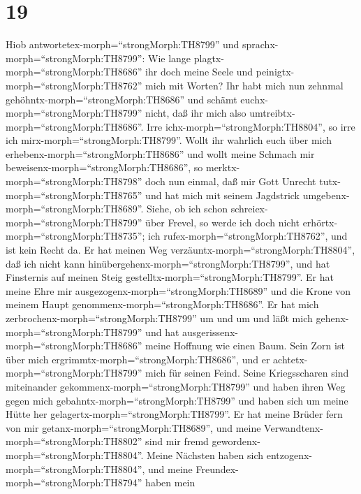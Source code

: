 \hypertarget{section-18}{%
\section{19}\label{section-18}}

 Hiob antwortetex-morph=``strongMorph:TH8799'' und
sprachx-morph=``strongMorph:TH8799'':  Wie lange
plagtx-morph=``strongMorph:TH8686'' ihr doch meine Seele und
peinigtx-morph=``strongMorph:TH8762'' mich mit Worten?  Ihr
habt mich nun zehnmal gehöhntx-morph=``strongMorph:TH8686'' und schämt
euchx-morph=``strongMorph:TH8799'' nicht, daß ihr mich also
umtreibtx-morph=``strongMorph:TH8686''.  Irre
ichx-morph=``strongMorph:TH8804'', so irre ich
mirx-morph=``strongMorph:TH8799''.  Wollt ihr wahrlich euch
über mich erhebenx-morph=``strongMorph:TH8686'' und wollt meine Schmach
mir beweisenx-morph=``strongMorph:TH8686'',  so
merktx-morph=``strongMorph:TH8798'' doch nun einmal, daß mir Gott
Unrecht tutx-morph=``strongMorph:TH8765'' und hat mich mit seinem
Jagdstrick umgebenx-morph=``strongMorph:TH8689''.  Siehe, ob
ich schon schreiex-morph=``strongMorph:TH8799'' über Frevel, so werde
ich doch nicht erhörtx-morph=``strongMorph:TH8735''; ich
rufex-morph=``strongMorph:TH8762'', und ist kein Recht da. 
Er hat meinen Weg verzäuntx-morph=``strongMorph:TH8804'', daß ich nicht
kann hinübergehenx-morph=``strongMorph:TH8799'', und hat Finsternis auf
meinen Steig gestelltx-morph=``strongMorph:TH8799''.  Er hat
meine Ehre mir ausgezogenx-morph=``strongMorph:TH8689'' und die Krone
von meinem Haupt genommenx-morph=``strongMorph:TH8686''. 
Er hat mich zerbrochenx-morph=``strongMorph:TH8799'' um und um und läßt
mich gehenx-morph=``strongMorph:TH8799'' und hat
ausgerissenx-morph=``strongMorph:TH8686'' meine Hoffnung wie einen Baum.
 Sein Zorn ist über mich
ergrimmtx-morph=``strongMorph:TH8686'', und er
achtetx-morph=``strongMorph:TH8799'' mich für seinen Feind.
 Seine Kriegsscharen sind miteinander
gekommenx-morph=``strongMorph:TH8799'' und haben ihren Weg gegen mich
gebahntx-morph=``strongMorph:TH8799'' und haben sich um meine Hütte her
gelagertx-morph=``strongMorph:TH8799''.  Er hat meine
Brüder fern von mir getanx-morph=``strongMorph:TH8689'', und meine
Verwandtenx-morph=``strongMorph:TH8802'' sind mir fremd
gewordenx-morph=``strongMorph:TH8804''.  Meine Nächsten
haben sich entzogenx-morph=``strongMorph:TH8804'', und meine
Freundex-morph=``strongMorph:TH8794'' haben mein
